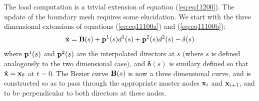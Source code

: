 \documentclass{article}
\begin{document}
The load computation is a trivial extension of equation (\ref{eq:eq11200}).  
The update of the boundary mesh requires some elucidation.  
We start with the three dimensional extensions of equations (\ref{eq:eq11100a}) and (\ref{eq:eq11100b}):
\begin{equation} \tilde{\bf x} = {\bf B}(s) + {\bf p}^1(s) d^1(s) + {\bf p}^2(s) d^2(s) - \mathbf{\delta}(s) \label{eq:eq11500} \end{equation}
where ${\bf p}^1(s)$ and ${\bf p}^2(s)$  are the interpolated directors at $s$ (where $s$ is defined analogously to the two dimensional case), and $\mathbf{\delta}(s)$ is similary defined so that $\tilde{\bf x} = {\bf x}_0$ at $t=0$.
The Bezier curve ${\bf B}(s)$ is now a three dimensional curve, and is constructed so as to pass through the appropriate master nodes ${\bf x}_i$ and ${\bf x}_{i+1}$, and to be perpendicular to both directors at these nodes. 
\appendix
\end{document}
